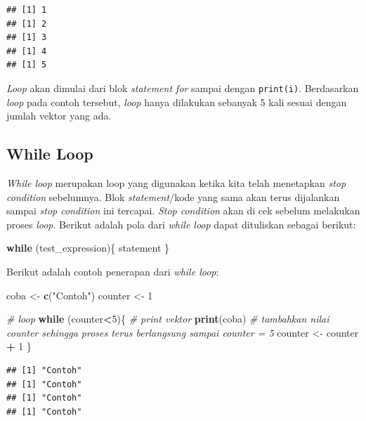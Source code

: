 \documentclass[
]{book}
\newenvironment{Shaded}{\begin{snugshade}}{\end{snugshade}}
\newcommand{\CommentTok}[1]{\textcolor[rgb]{0.56,0.35,0.01}{\textit{#1}}}
\newcommand{\ControlFlowTok}[1]{\textcolor[rgb]{0.13,0.29,0.53}{\textbf{#1}}}
\newcommand{\DecValTok}[1]{\textcolor[rgb]{0.00,0.00,0.81}{#1}}
\newcommand{\FunctionTok}[1]{\textcolor[rgb]{0.13,0.29,0.53}{\textbf{#1}}}
\newcommand{\NormalTok}[1]{#1}
\newcommand{\OtherTok}[1]{\textcolor[rgb]{0.56,0.35,0.01}{#1}}
\newcommand{\SpecialCharTok}[1]{\textcolor[rgb]{0.81,0.36,0.00}{\textbf{#1}}}
\newcommand{\StringTok}[1]{\textcolor[rgb]{0.31,0.60,0.02}{#1}}
\theoremstyle{definition}
\theoremstyle{definition}
\theoremstyle{definition}
\theoremstyle{definition}
\theoremstyle{remark}
\begin{document}
\begin{verbatim}
## [1] 1
## [1] 2
## [1] 3
## [1] 4
## [1] 5
\end{verbatim}

\emph{Loop} akan dimulai dari blok \emph{statement for} sampai dengan \texttt{print(i)}. Berdasarkan \emph{loop} pada contoh tersebut, \emph{loop} hanya dilakukan sebanyak 5 kali sesuai dengan jumlah vektor yang ada.

\hypertarget{whileloop}{%
\subsection{While Loop}\label{whileloop}}

\emph{While loop} merupakan loop yang digunakan ketika kita telah menetapkan \emph{stop condition} sebelumnya. Blok \emph{statement}/kode yang sama akan terus dijalankan sampai \emph{stop condition} ini tercapai. \emph{Stop condition} akan di cek sebelum melakukan proses \emph{loop}. Berikut adalah pola dari \emph{while loop} dapat dituliskan sebagai berikut:

\begin{Shaded}
\begin{Highlighting}[]
\ControlFlowTok{while}\NormalTok{ (test\_expression)\{}
\NormalTok{  statement}
\NormalTok{\}}
\end{Highlighting}
\end{Shaded}

Berikut adalah contoh penerapan dari \emph{while loop}:

\begin{Shaded}
\begin{Highlighting}[]
\NormalTok{coba }\OtherTok{\textless{}{-}} \FunctionTok{c}\NormalTok{(}\StringTok{"Contoh"}\NormalTok{)}
\NormalTok{counter }\OtherTok{\textless{}{-}} \DecValTok{1}

\CommentTok{\# loop}
\ControlFlowTok{while}\NormalTok{ (counter}\SpecialCharTok{\textless{}}\DecValTok{5}\NormalTok{)\{}
  \CommentTok{\# print vektor}
  \FunctionTok{print}\NormalTok{(coba)}
  \CommentTok{\# tambahkan nilai counter sehingga proses terus berlangsung sampai counter = 5 }
\NormalTok{  counter }\OtherTok{\textless{}{-}}\NormalTok{ counter }\SpecialCharTok{+} \DecValTok{1}
\NormalTok{\}}
\end{Highlighting}
\end{Shaded}

\begin{verbatim}
## [1] "Contoh"
## [1] "Contoh"
## [1] "Contoh"
## [1] "Contoh"
\end{verbatim}
\end{document}
